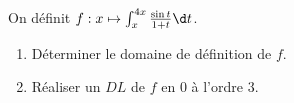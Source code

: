 \begin{enonce}
\begin{exercise}[ID={RMS133 E1466},subtitle={CCINP PC 2022},tags={},difficulty={}]
  On définit $f:x\mapsto\int_x^{4x} \frac{\sin t}{1+t}\d t$.
  \begin{enumerate}
    \item Déterminer le domaine de définition de $f$.
    \item Réaliser un $DL$ de $f$ en $0$ à l'ordre $3$.
  \end{enumerate}
\end{exercise}
\begin{solution}
\end{solution}
\end{enonce}
